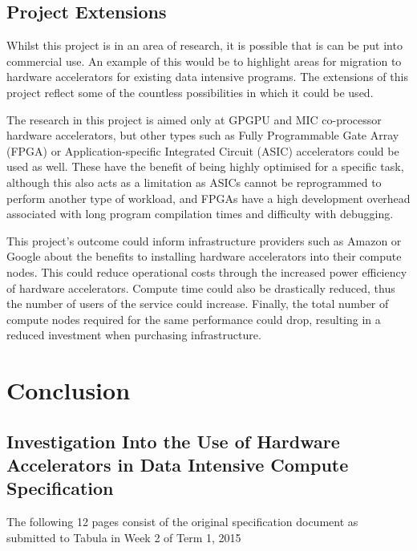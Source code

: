 \documentclass[12pt,a4paper]{article}
\begin{document}
        \subsection{Project Extensions}
        \label{sub:project_extensions}

            Whilst this project is in an area of research, it is possible that is can be put into commercial use. An example of this would be to highlight areas for migration to hardware accelerators for existing data intensive programs. The extensions of this project reflect some of the countless possibilities in which it could be used.

            \begin{description}[style=nextline]
                \item[\textbf{Additional Accelerator Types}] The research in this project is aimed only at GPGPU and MIC co-processor hardware accelerators, but other types such as Fully Programmable Gate Array (FPGA) or Application-specific Integrated Circuit (ASIC) accelerators could be used as well. These have the benefit of being highly optimised for a specific task, although this also acts as a limitation as ASICs cannot be reprogrammed to perform another type of workload, and FPGAs have a high development overhead associated with long program compilation times and difficulty with debugging.
                \item[\textbf{Infrastructure Design}] This project's outcome could inform infrastructure providers such as Amazon or Google about the benefits to installing hardware accelerators into their compute nodes. This could reduce operational costs through the increased power efficiency of hardware accelerators. Compute time could also be drastically reduced, thus the number of users of the service could increase. Finally, the total number of compute nodes required for the same performance could drop, resulting in a reduced investment when purchasing infrastructure.
            \end{description}
        
    \section{Conclusion}
    \label{sec:conclusion}
    

	\printbibliography
	
	\begin{appendix}
	    \section{Investigation Into the Use of Hardware Accelerators in Data Intensive Compute Specification}
	    The following 12 pages consist of the original specification document as submitted to Tabula in Week 2 of Term 1, 2015
	    \label{app:specification}
	    
	        
	\end{appendix}
\end{document}

